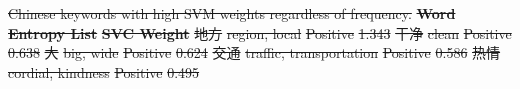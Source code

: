 \documentclass[smallextended,natbib]{svjour3}       %
\providecommand{\DIFdel}[1]{{\protect\color{red}\sout{#1}}}                      %
\providecommand{\DIFdelFL}[1]{\DIFdel{#1}} %
\begin{document}
{%
\DIFdelFL{Chinese keywords with high SVM weights regardless of frequency.}}
\textbf{\DIFdelFL{Word}} %
\textbf{\DIFdelFL{Entropy List}} %
\textbf{\DIFdelFL{SVC Weight}} %
\DIFdelFL{地方 }%
\DIFdelFL{region, local 
        }%
\DIFdelFL{Positive 
        }%
\DIFdelFL{1.343 }%
\DIFdelFL{干净 }%
\DIFdelFL{clean 
        }%
\DIFdelFL{Positive 
        }%
\DIFdelFL{0.638 }%
\DIFdelFL{大 }%
\DIFdelFL{big, wide 
        }%
\DIFdelFL{Positive 
        }%
\DIFdelFL{0.624 }%
\DIFdelFL{交通 }%
\DIFdelFL{traffic, transportation 
        }%
\DIFdelFL{Positive 
        }%
\DIFdelFL{0.586 }%
\DIFdelFL{热情 }%
\DIFdelFL{cordial, kindness 
        }%
\DIFdelFL{Positive 
        }%
\DIFdelFL{0.495 }%
\end{document}
